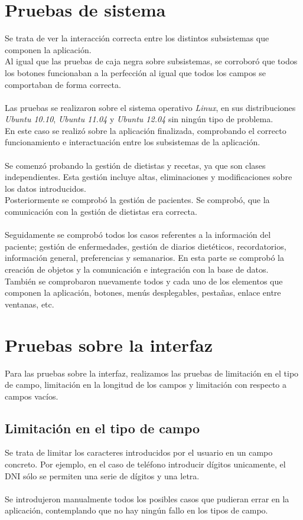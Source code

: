 \section{Pruebas de sistema}
Se trata de ver la interacción correcta entre los distintos subsistemas que componen la aplicación.\\
Al igual que las pruebas de caja negra sobre subsistemas, se corroboró que todos los botones funcionaban a la perfección al igual que todos los campos se comportaban de forma correcta.\\\\ 
Las pruebas se realizaron sobre el sistema operativo \textit{Linux}, en sus distribuciones \textit{Ubuntu 10.10}, \textit{Ubuntu 11.04} y \textit{Ubuntu 12.04} sin ningún tipo de problema.\\
En este caso se realizó sobre la aplicación finalizada, comprobando el correcto funcionamiento e interactuación entre los subsistemas de la aplicación.\\\\
Se comenzó probando la gestión de dietistas y recetas, ya que son clases independientes. Esta gestión incluye altas, eliminaciones y modificaciones sobre los datos introducidos.\\
Posteriormente se comprobó la gestión de pacientes. Se comprobó, que la comunicación con la gestión de dietistas
era correcta.\\\\
Seguidamente se comprobó todos los casos referentes a la información del paciente; gestión de enfermedades, gestión de diarios dietéticos, recordatorios, información general, preferencias y semanarios. En esta parte se comprobó la creación de objetos y la comunicación e integración con la base de datos.\\
También se comprobaron nuevamente todos y cada uno de los elementos que componen la aplicación, botones, menús desplegables, pestañas, enlace entre ventanas, etc.

\section{Pruebas sobre la interfaz}

Para las pruebas sobre la interfaz, realizamos las pruebas de limitación en el tipo de campo, limitación en la longitud de los campos y limitación con respecto a campos vacíos.

\subsection{Limitación en el tipo de campo}
Se trata de limitar los caracteres introducidos por el usuario en un campo concreto. Por ejemplo, en el caso de teléfono introducir dígitos unicamente, el DNI sólo se permiten una serie de dígitos y una letra.\\\\
Se introdujeron manualmente todos los posibles casos que pudieran errar en la aplicación, contemplando que no hay ningún fallo en los tipos de campo.

